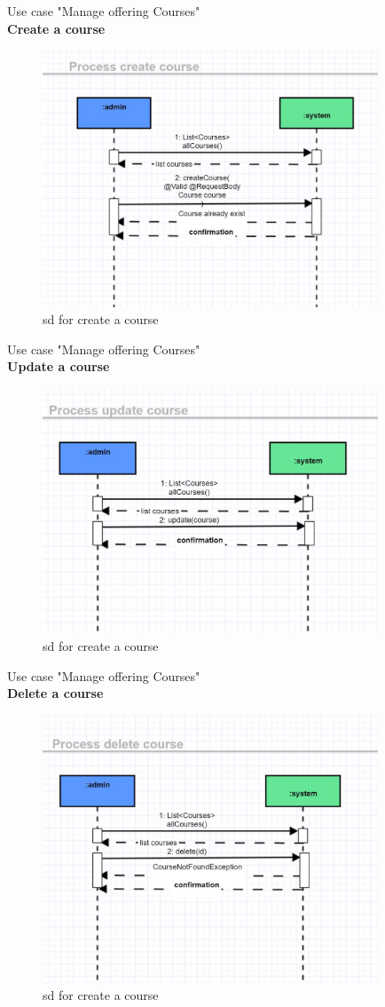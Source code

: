 \documentclass{scrartcl}
\begin{document}
Use case "Manage offering Courses"\\
\textbf{Create a course}
\begin{figure}[H]
\centering
\includegraphics[width = 100mm]{sd/sd-createCourse}
\caption{sd for create a course }
\label{sd for create a course}
\end{figure}

Use case "Manage offering Courses"\\
\textbf{Update a course}
\begin{figure}[H]
\centering
\includegraphics[width = 100mm]{sd/sd-updateCourse}
\caption{sd for create a course }
\label{sd for update a course}
\end{figure}

Use case "Manage offering Courses"\\
\textbf{Delete a course}
\begin{figure}[H]
\centering
\includegraphics[width = 100mm]{sd/sd-deleteCourse}
\caption{sd for create a course }
\label{sd for delete a course}
\end{figure}
\end{document}
